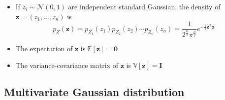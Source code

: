 \documentclass[12pt,a4paper]{article}
\begin{document}
\begin{itemize}
  \begin{itemize}

    \item If
      $z_{i}\sim \mathcal{N}(0,1)$
      are independent standard Gaussian,
      the density of $\bm{z}=(z_{1},\ldots, z_{n})$ is
      \begin{equation}\nonumber%
        p_{Z}(\bm{z})
        = p_{Z_{1}}(z_{1})p_{Z_{2}}(z_{2})\cdots p_{Z_{n}}(z_{n}) 
        = 
        \frac{1}{2^{\frac{n}{2}}\pi^{\frac{n}{2}}}
        e^{-\frac{1}{2}\bm{z}^{\top}\bm{z}}
      \end{equation}
    \item The expectation of $\bm{z}$ is $\mathbb{E}\left[\bm{z}\right]=\bm{0}$
    \item The variance-covariance matrix of $\bm{z}$ is $\mathbb{V}[\bm{z}]=\bm{I}$

  \end{itemize}
\end{itemize}

\subsection{Multivariate Gaussian distribution}
\end{document}

